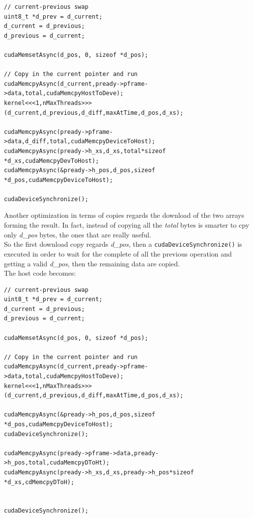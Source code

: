 \documentclass[paper=a4, fontsize=10pt]{scrartcl}	%
\begin{document}
	\begin{lstlisting}[style=CStyle]
// current-previous swap
uint8_t *d_prev = d_current;
d_current = d_previous;
d_previous = d_current;

cudaMemsetAsync(d_pos, 0, sizeof *d_pos);

// Copy in the current pointer and run 
cudaMemcpyAsync(d_current,pready->pframe->data,total,cudaMemcpyHostToDeve);
kernel<<<1,nMaxThreads>>>(d_current,d_previous,d_diff,maxAtTime,d_pos,d_xs);

cudaMemcpyAsync(pready->pframe->data,d_diff,total,cudaMemcpyDeviceToHost);
cudaMemcpyAsync(pready->h_xs,d_xs,total*sizeof *d_xs,cudaMemcpyDevToHost);
cudaMemcpyAsync(&pready->h_pos,d_pos,sizeof *d_pos,cudaMemcpyDeviceToHost);

cudaDeviceSynchronize();
	\end{lstlisting}

	Another optimization in terms of copies regards the download of the two arrays forming the result. In fact, instead of copying all the \textit{total} bytes is smarter to cpy only \textit{d\_pos} bytes, the ones that are really useful.\\

	So the first download copy regards \textit{d\_pos}, then a \texttt{cudaDeviceSynchronize()} is executed in order to wait for the complete of all the previous operation and getting a valid \textit{d\_pos}, then the remaining data are copied. \\
	
	The host code becomes:

	\begin{lstlisting}[style=CStyle]
// current-previous swap
uint8_t *d_prev = d_current;
d_current = d_previous;
d_previous = d_current;

cudaMemsetAsync(d_pos, 0, sizeof *d_pos);

// Copy in the current pointer and run 
cudaMemcpyAsync(d_current,pready->pframe->data,total,cudaMemcpyHostToDeve);
kernel<<<1,nMaxThreads>>>(d_current,d_previous,d_diff,maxAtTime,d_pos,d_xs);

cudaMemcpyAsync(&pready->h_pos,d_pos,sizeof *d_pos,cudaMemcpyDeviceToHost);
cudaDeviceSynchronize();

cudaMemcpyAsync(pready->pframe->data,pready->h_pos,total,cudaMemcpyDToHt);
cudaMemcpyAsync(pready->h_xs,d_xs,pready->h_pos*sizeof *d_xs,cdMemcpyDToH);


cudaDeviceSynchronize();
	\end{lstlisting}
\end{document}
